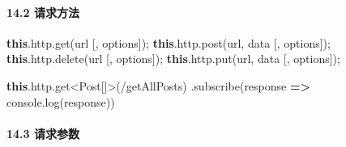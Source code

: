 \documentclass[
]{article}
\newenvironment{Shaded}{}{}
\newcommand{\AttributeTok}[1]{\textcolor[rgb]{0.49,0.56,0.16}{#1}}
\newcommand{\BuiltInTok}[1]{#1}
\newcommand{\FunctionTok}[1]{\textcolor[rgb]{0.02,0.16,0.49}{#1}}
\newcommand{\KeywordTok}[1]{\textcolor[rgb]{0.00,0.44,0.13}{\textbf{#1}}}
\newcommand{\NormalTok}[1]{#1}
\newcommand{\OperatorTok}[1]{\textcolor[rgb]{0.40,0.40,0.40}{#1}}
\newcommand{\StringTok}[1]{\textcolor[rgb]{0.25,0.44,0.63}{#1}}
\begin{document}
\hypertarget{142--ux8bf7ux6c42ux65b9ux6cd5}{%
\paragraph{14.2 请求方法}\label{142--ux8bf7ux6c42ux65b9ux6cd5}}

\begin{Shaded}
\begin{Highlighting}[]
\KeywordTok{this}\OperatorTok{.}\AttributeTok{http}\OperatorTok{.}\FunctionTok{get}\NormalTok{(url [}\OperatorTok{,}\NormalTok{ options])}\OperatorTok{;}
\KeywordTok{this}\OperatorTok{.}\AttributeTok{http}\OperatorTok{.}\FunctionTok{post}\NormalTok{(url}\OperatorTok{,}\NormalTok{ data [}\OperatorTok{,}\NormalTok{ options])}\OperatorTok{;}
\KeywordTok{this}\OperatorTok{.}\AttributeTok{http}\OperatorTok{.}\FunctionTok{delete}\NormalTok{(url [}\OperatorTok{,}\NormalTok{ options])}\OperatorTok{;}
\KeywordTok{this}\OperatorTok{.}\AttributeTok{http}\OperatorTok{.}\FunctionTok{put}\NormalTok{(url}\OperatorTok{,}\NormalTok{ data [}\OperatorTok{,}\NormalTok{ options])}\OperatorTok{;}
\end{Highlighting}
\end{Shaded}

\begin{Shaded}
\begin{Highlighting}[]
\KeywordTok{this}\OperatorTok{.}\AttributeTok{http}\OperatorTok{.}\AttributeTok{get}\OperatorTok{\textless{}}\NormalTok{Post[]}\OperatorTok{\textgreater{}}\NormalTok{(}\StringTok{\textquotesingle{}/getAllPosts\textquotesingle{}}\NormalTok{)}
  \OperatorTok{.}\FunctionTok{subscribe}\NormalTok{(response }\KeywordTok{=\textgreater{}} \BuiltInTok{console}\OperatorTok{.}\FunctionTok{log}\NormalTok{(response))}
\end{Highlighting}
\end{Shaded}

\hypertarget{143-ux8bf7ux6c42ux53c2ux6570}{%
\paragraph{14.3 请求参数}\label{143-ux8bf7ux6c42ux53c2ux6570}}
\end{document}
